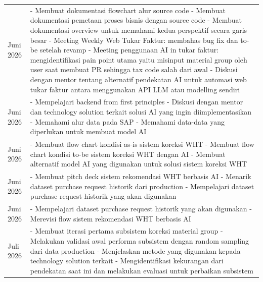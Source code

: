 \begin{longtable}{>{\raggedright\arraybackslash}p{2.7cm} >{\raggedright\arraybackslash}p{\dimexpr\textwidth-2.7cm-4\tabcolsep\relax}}
    24 Juni 2026 & - Membuat dokumentasi flowchart alur source code \newline - Membuat dokumentasi pemetaan proses bisnis dengan source code \newline - Membuat dokumentasi overview untuk memahami kedua perspektif secara garis besar \newline - Meeting Weekly Web Tukar Faktur: membahas bug fix dan to-be setelah revamp \newline - Meeting penggunaan AI in tukar faktur: mengidentifikasi pain point utama yaitu misinput material group oleh user saat membuat PR sehingga tax code salah dari awal \newline - Diskusi dengan mentor tentang alternatif pendekatan AI untuk automasi web tukar faktur antara menggunakan API LLM atau modelling sendiri \\
    25 Juni 2026 & - Mempelajari backend from first principles \newline - Diskusi dengan mentor dan technology solution terkait solusi AI yang ingin diimplementasikan \newline - Memahami alur data pada SAP \newline - Memahami data-data yang diperlukan untuk membuat model AI \\
    26 Juni 2026 & - Membuat flow chart kondisi as-is sistem koreksi WHT \newline - Membuat flow chart kondisi to-be sistem koreksi WHT dengan AI \newline - Membuat alternatif model AI yang digunakan untuk solusi sistem koreksi WHT \\
    29 Juni 2026 & - Membuat pitch deck sistem rekomendasi WHT berbasis AI \newline - Menarik dataset purchase request historik dari production \newline - Mempelajari dataset purchase request historik yang akan digunakan \\
    30 Juni 2026 & - Mempelajari dataset purchase request historik yang akan digunakan \newline - Merevisi flow sistem rekomendasi WHT berbasis AI \\
    1 Juli 2026 & - Membuat iterasi pertama subsistem koreksi material group \newline - Melakukan validasi awal performa subsistem dengan random sampling dari data production \newline - Menjelaskan metode yang digunakan kepada technology solution terkait \newline - Mengidentifikasi kekurangan dari pendekatan saat ini dan melakukan evaluasi untuk perbaikan subsistem \\

\end{longtable}
